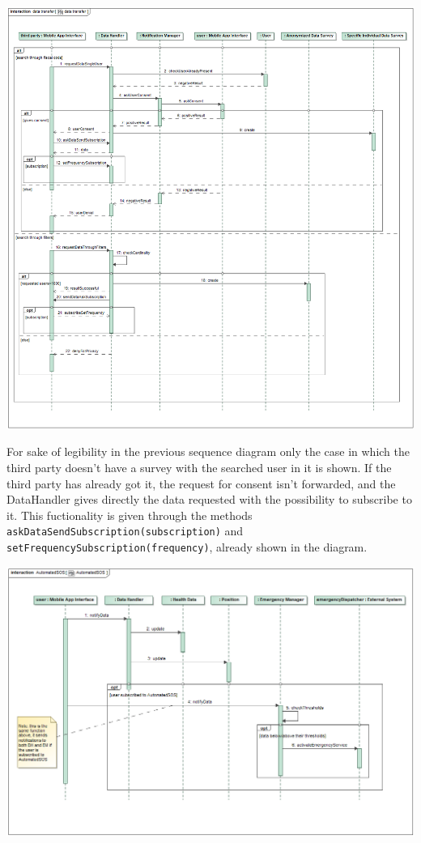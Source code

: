 \begin{center}
\includegraphics[scale=0.4]{sections/diagrams/data_transfer}
\newline
{}
\end{center}

For sake of legibility in the previous sequence diagram only the case in which the third party doesn't have a survey with the searched user in it is shown. If the third party has already got it, the request for consent isn't forwarded, and the DataHandler gives directly the data requested with the possibility to subscribe to it. This fuctionality is given through the methods \texttt{askDataSendSubscription(subscription)} and \texttt{setFrequencySubscription(frequency)}, alrea\-dy shown in the diagram.

\begin{center}
\includegraphics[scale=0.4]{sections/diagrams/AutomatedSOS}
\newline
{}
\end{center} 

